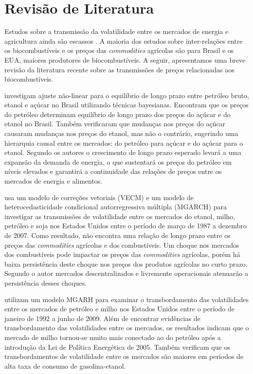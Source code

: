 	\section{Revisão de Literatura}
			
	Estudos sobre a transmissão da  volatilidade entre os mercados de energia e agricultura ainda são escassos \cite{serra_volatility_2011, gardebroek_energy_2013, lopez_cabrera_volatility_2016}. A maioria dos estudos sobre inter-relações entre os biocombustíveis e os preços das \emph{\emph{commodities}} agrícolas são para  Brasil e os EUA,  maiores produtores de biocombustíveis. A seguir, apresentamos uma breve revisão  da literatura recente sobre as transmissões de preços relacionadas aos biocombustíveis.   
	
	 investigam  ajuste não-linear para o equilíbrio de longo prazo entre petróleo bruto, etanol e açúcar no Brasil utilizando técnicas bayesianas.  Encontram que os preços do petróleo determinam equilíbrio de longo prazo dos preços do açúcar e do etanol no Brasil. Também verificaram que mudanças nos preços do açúcar causaram mudanças nos preços do etanol, mas não o contrário, sugerindo uma hierarquia causal entre os mercados: do petróleo para açúcar e do açúcar para o etanol. Segundo os autores o crescimento de longo prazo esperado levará a uma expansão da demanda de energia, o que sustentará os preços do petróleo em níveis elevados e garantirá a continuidade das relações de preços entre os mercados de energia e alimentos. 
	
	 usa um modelo de correções vetoriais (VECM) e um modelo de heterocedasticidade  condicional autorregressiva múltipla (MGARCH) para investigar as transmissões de volatilidade entre os mercados do etanol, milho, petróleo e soja nos Estados Unidos entre o período de março de 1987 a dezembro de 2007. Como resultado, não encontra uma relação de longo prazo entre os preços das \emph{commodities} agrícolas e dos combustíveis. Um choque nos mercados dos combustíveis pode impactar os preços das \emph{commodities} agrícolas, porém há baixa persistência deste choque nos preços dos produtos agrícolas no curto prazo.  Segundo o autor  mercados descentralizados e livremente operacionais atenuarão a persistência desses choques.
	
	 utilizam um modelo MGARH para examinar o transbordamento das volatilidades entre os mercados de petróleo e milho nos Estados Unidos entre o período de janeiro de 1992 a junho de 2009. Além de encontrar evidências de transbordamento das volatilidades entre os mercados, os  resultados indicam que o mercado de milho tornou-se muito mais conectado ao  do petróleo após a introdução da Lei de Política Energética de 2005. Também verificam que os transbordamentos de volatilidade entre os mercados são maiores em períodos de alta taxa de consumo de gasolina-etanol. 
	
